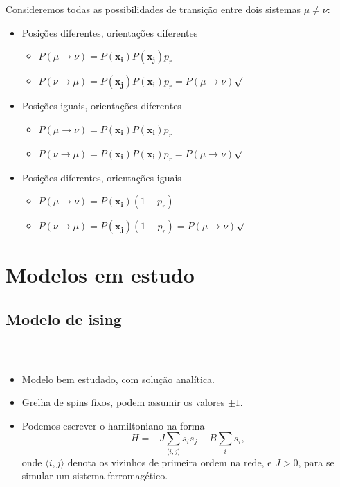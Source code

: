 \documentclass[11pt]{beamer}
\begin{document}
\begin{frame}
\frametitle{\insertsection \\ {\small \insertsubsection}}
Consideremos todas as possibilidades de transição entre dois sistemas $\mu \neq \nu$:
\begin{itemize}

\item Posições diferentes, orientações diferentes
\begin{itemize}
\item $P(\mu\rightarrow\nu) = P(\mathbf{x_i})P(\mathbf{x_j})p_r$
\item $P(\nu\rightarrow\mu) = P(\mathbf{x_j})P(\mathbf{x_i})p_r = P(\mu\rightarrow\nu)${\color{green}$\surd$}
\end{itemize}

\item Posições iguais, orientações diferentes
\begin{itemize}
\item $P(\mu\rightarrow\nu) = P(\mathbf{x_i})P(\mathbf{x_i})p_r$
\item $P(\nu\rightarrow\mu) = P(\mathbf{x_i})P(\mathbf{x_i})p_r = P(\mu\rightarrow\nu)${\color{green}$\surd$}
\end{itemize}

\item Posições diferentes, orientações iguais
\begin{itemize}
\item $P(\mu\rightarrow\nu) = P(\mathbf{x_i})(1-p_r)$
\item $P(\nu\rightarrow\mu) = P(\mathbf{x_j})(1-p_r) = P(\mu\rightarrow\nu)${\color{green}$\surd$}
\end{itemize}

\end{itemize}
\end{frame}

\section{Modelos em estudo}
\subsection{Modelo de ising}
\begin{frame}
\frametitle{\insertsection \\ {\small \insertsubsection}}
\begin{itemize}
\item Modelo bem estudado, com solução analítica.
\item Grelha de spins fixos, podem assumir os valores $\pm 1$.
\item Podemos escrever o hamiltoniano na forma
\begin{equation}
H = - J \sum_{\langle i,j \rangle} s_i s_j - B \sum_i s_i ,
\end{equation}
onde $\langle i,j \rangle$ denota os vizinhos de primeira ordem na rede, e $J > 0$, para se simular um sistema ferromagético.
\end{itemize}
\end{frame}
\end{document}
